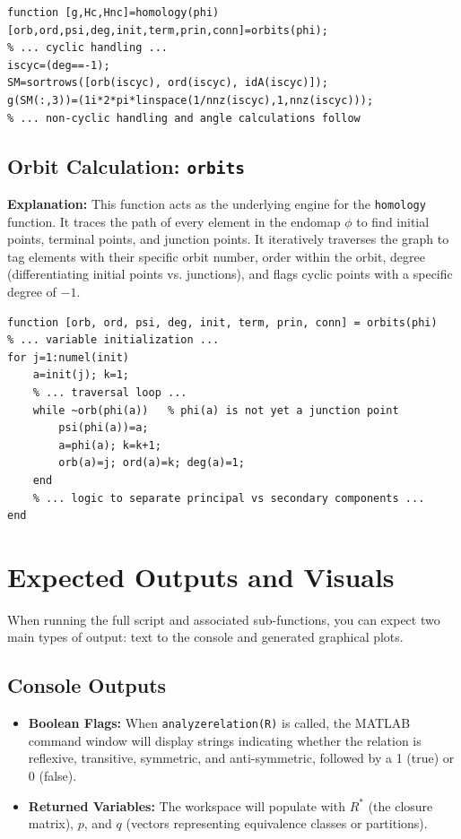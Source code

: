 \begin{lstlisting}[caption={Homology of Endomaps Snippet}]
function [g,Hc,Hnc]=homology(phi)
[orb,ord,psi,deg,init,term,prin,conn]=orbits(phi);
% ... cyclic handling ...
iscyc=(deg==-1);
SM=sortrows([orb(iscyc), ord(iscyc), idA(iscyc)]);
g(SM(:,3))=(1i*2*pi*linspace(1/nnz(iscyc),1,nnz(iscyc)));
% ... non-cyclic handling and angle calculations follow
\end{lstlisting}

\subsection{Orbit Calculation: \texttt{orbits}}
\textbf{Explanation:} This function acts as the underlying engine for the \texttt{homology} function. It traces the path of every element in the endomap $\phi$ to find initial points, terminal points, and junction points. It iteratively traverses the graph to tag elements with their specific orbit number, order within the orbit, degree (differentiating initial points vs. junctions), and flags cyclic points with a specific degree of $-1$.

\begin{lstlisting}[caption={Orbit Calculation Snippet}]
function [orb, ord, psi, deg, init, term, prin, conn] = orbits(phi)
% ... variable initialization ...
for j=1:numel(init)
    a=init(j); k=1;
    % ... traversal loop ...
    while ~orb(phi(a))   % phi(a) is not yet a junction point
        psi(phi(a))=a; 
        a=phi(a); k=k+1;  
        orb(a)=j; ord(a)=k; deg(a)=1;
    end
    % ... logic to separate principal vs secondary components ...
end
\end{lstlisting}

\section{Expected Outputs and Visuals}

When running the full script and associated sub-functions, you can expect two main types of output: text to the console and generated graphical plots.

\subsection*{Console Outputs}
\begin{itemize}
    \item \textbf{Boolean Flags:} When \texttt{analyzerelation(R)} is called, the MATLAB command window will display strings indicating whether the relation is reflexive, transitive, symmetric, and anti-symmetric, followed by a 1 (true) or 0 (false).
    \item \textbf{Returned Variables:} The workspace will populate with $R^*$ (the closure matrix), $p$, and $q$ (vectors representing equivalence classes or partitions).
\end{itemize}

